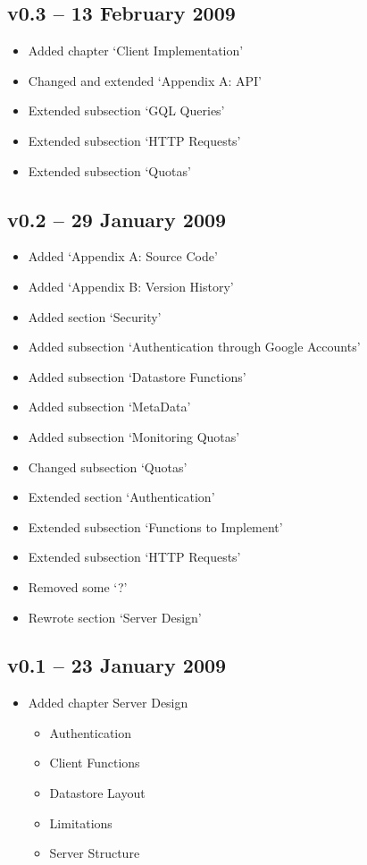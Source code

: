 \subsection*{v0.3 -- 13 February 2009}
\begin{itemize}
\item Added chapter `Client Implementation'
\item Changed and extended `Appendix A: API'
\item Extended subsection `GQL Queries'
\item Extended subsection `HTTP Requests'
\item Extended subsection `Quotas'
\end{itemize}

\subsection*{v0.2 -- 29 January 2009}
\begin{itemize}
\item Added `Appendix A: Source Code'
\item Added `Appendix B: Version History'
\item Added section `Security'
\item Added subsection `Authentication through Google Accounts'
\item Added subsection `Datastore Functions'
\item Added subsection `MetaData'
\item Added subsection `Monitoring Quotas'
\item Changed subsection `Quotas'
\item Extended section `Authentication'
\item Extended subsection `Functions to Implement'
\item Extended subsection `HTTP Requests'
\item Removed some `?'
\item Rewrote section `Server Design'
\end{itemize}

\subsection*{v0.1 -- 23 January 2009}
\begin{itemize}
\item Added chapter Server Design
\begin{itemize}
  \item Authentication
  \item Client Functions
  \item Datastore Layout
  \item Limitations
  \item Server Structure
\end{itemize}
\end{itemize}